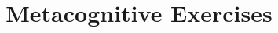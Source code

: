 
\graphicspath{{../../../images/Exercises/}} %


\title{Metacognitive Exercises} %



\begin{frame}
\titlepage %
\end{frame}



 